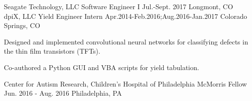 \begin{cventries}
  \cventry
  	{Seagate Technology, LLC} %
    {Software Engineer I} %
    {Jul.-Sept. 2017} %
    {Longmont, CO} %
    {
    }
  \cventry
  	{dpiX, LLC} %
    {Yield Engineer Intern} %
    {Apr.2014-Feb.2016;Aug.2016-Jan.2017} %
    {Colorado Springs, CO} %
    {
      \begin{cvitems} %
        \item {Designed and implemented convolutional neural networks for classifying defects in the thin film transistors (TFTs).}
        \item {Co-authored a Python GUI and VBA scripts for yield tabulation.}
    \end{cvitems}
    }
  \cventry
    {Center for Autism Research, Children’s Hospital of Philadelphia} %
    {McMorris Fellow} %
    {Jun. 2016 - Aug. 2016} %
    {Philadelphia, PA} %
    {
}
\end{cventries}
